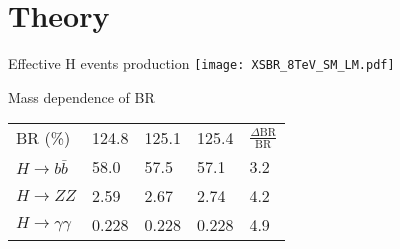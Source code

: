 \section{Theory}
\begin{frame}{Effective H events production}
  \centering
  \texttt{[image: XSBR\_8TeV\_SM\_LM.pdf]}
\end{frame}

\begin{frame}{Mass dependence of BR}
  \centering
  \begin{tabular}{lllll}
    BR (\%) & 124.8 & 125.1 & 125.4 & $\frac{\Delta \text{BR}}{\text{BR}}$\\
    $H\rightarrow b\bar{b}$ & 58.0 & 57.5 & 57.1 & 3.2\\
    $H\rightarrow ZZ$ & 2.59 & 2.67 & 2.74 & 4.2\\
    $H\rightarrow \gamma\gamma$ & 0.228 & 0.228 & 0.228 & 4.9\\
  \end{tabular}
\end{frame}
